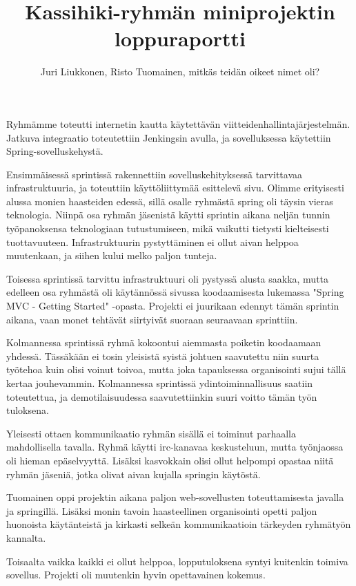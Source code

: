 \documentclass[a4paper]{article}
\author{Juri Liukkonen, Risto Tuomainen, mitkäs teidän oikeet nimet oli?}
\title{Kassihiki-ryhmän miniprojektin loppuraportti}
\begin{document}
\maketitle
\noindent
Ryhmämme toteutti internetin kautta käytettävän viitteidenhallintajärjestelmän. Jatkuva integraatio toteutettiin Jenkingsin avulla, ja sovelluksessa käytettiin Spring-sovelluskehystä. 

Ensimmäisessä sprintissä rakennettiin sovelluskehityksessä tarvittavaa infrastruktuuria, ja toteuttiin käyttöliittymää esittelevä sivu. Olimme erityisesti alussa monien haasteiden edessä, sillä osalle ryhmästä spring oli täysin vieras teknologia. Niinpä osa ryhmän jäsenistä käytti sprintin aikana neljän tunnin työpanoksensa teknologiaan tutustumiseen, mikä vaikutti tietysti kielteisesti tuottavuuteen. Infrastruktuurin pystyttäminen ei ollut aivan helppoa muutenkaan, ja siihen kului melko paljon tunteja.  

Toisessa sprintissä tarvittu infrastruktuuri oli pystyssä alusta saakka, mutta edelleen osa ryhmästä oli käytännössä sivussa koodaamisesta lukemassa "Spring MVC - Getting Started" -opasta. Projekti ei juurikaan edennyt tämän sprintin aikana, vaan monet tehtävät siirtyivät suoraan seuraavaan sprinttiin. 

Kolmannessa sprintissä ryhmä kokoontui aiemmasta poiketin koodaamaan yhdessä. Tässäkään ei tosin yleisistä syistä johtuen saavutettu niin suurta työtehoa kuin olisi voinut toivoa, mutta joka tapauksessa organisointi sujui tällä kertaa jouhevammin. Kolmannessa sprintissä ydintoiminnallisuus saatiin toteutettua, ja demotilaisuudessa saavutettiinkin suuri voitto tämän työn tuloksena.

Yleisesti ottaen kommunikaatio ryhmän sisällä ei toiminut parhaalla mahdollisella tavalla. Ryhmä käytti irc-kanavaa keskusteluun, mutta työnjaossa oli hieman epäselvyyttä. Lisäksi kasvokkain olisi ollut helpompi opastaa niitä ryhmän jäseniä, jotka olivat aivan kujalla springin käytöstä.  


Tuomainen oppi projektin aikana paljon web-sovellusten toteuttamisesta javalla ja springillä. Lisäksi monin tavoin haasteellinen organisointi opetti paljon huonoista käytänteistä ja kirkasti selkeän kommunikaatioin tärkeyden ryhmätyön kannalta. 

Toisaalta vaikka kaikki ei ollut helppoa, lopputuloksena syntyi kuitenkin toimiva sovellus. Projekti oli muutenkin hyvin opettavainen kokemus.
\end{document}
